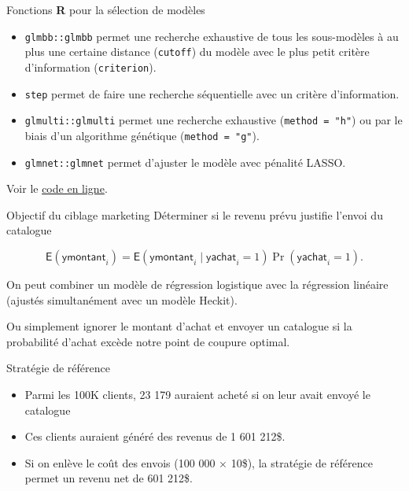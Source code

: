 \documentclass[
  ignorenonframetext,
]{beamer}
\providecommand{\tightlist}{%
  \setlength{\itemsep}{0pt}\setlength{\parskip}{0pt}}\usepackage{longtable,booktabs,array}
\begin{document}
\begin{frame}[fragile]{Fonctions \textbf{R} pour la sélection de
modèles}
\protect\hypertarget{fonctions-r-pour-la-suxe9lection-de-moduxe8les}{}
\begin{itemize}
\tightlist
\item
  \texttt{glmbb::glmbb} permet une recherche exhaustive de tous les
  sous-modèles à au plus une certaine distance (\texttt{cutoff}) du
  modèle avec le plus petit critère d'information (\texttt{criterion}).
\item
  \texttt{step} permet de faire une recherche séquentielle avec un
  critère d'information.
\item
  \texttt{glmulti::glmulti} permet une recherche exhaustive
  (\texttt{method\ =\ "h"}) ou par le biais d'un algorithme génétique
  (\texttt{method\ =\ "g"}).
\item
  \texttt{glmnet::glmnet} permet d'ajuster le modèle avec pénalité
  LASSO.
\end{itemize}

Voir le
\href{https://lbelzile.github.io/math60602/05-reglogistique.html\#s\%C3\%A9lection-de-variables-en-r\%C3\%A9gression-logistique}{code
en ligne}.
\end{frame}

\begin{frame}{Objectif du ciblage marketing}
\protect\hypertarget{objectif-du-ciblage-marketing}{}
Déterminer si le revenu prévu justifie l'envoi du catalogue

\[\mathsf{E}(\textsf{ymontant}_i) = \mathsf{E}(\textsf{ymontant}_i \mid \textsf{yachat}_i = 1)\Pr(\textsf{yachat}_i = 1).\]

On peut combiner un modèle de régression logistique avec la régression
linéaire (ajustés simultanément avec un modèle Heckit).

Ou simplement ignorer le montant d'achat et envoyer un catalogue si la
probabilité d'achat excède notre point de coupure optimal.
\end{frame}

\begin{frame}{Stratégie de référence}
\protect\hypertarget{stratuxe9gie-de-ruxe9fuxe9rence}{}
\begin{itemize}
\tightlist
\item
  Parmi les 100K clients, 23 179 auraient acheté si on leur avait envoyé
  le catalogue
\item
  Ces clients auraient généré des revenus de 1 601 212\$.
\item
  Si on enlève le coût des envois (100 000 \(\times\) 10\$), la
  stratégie de référence permet un revenu net de 601 212\$.
\end{itemize}
\end{frame}
\end{document}
